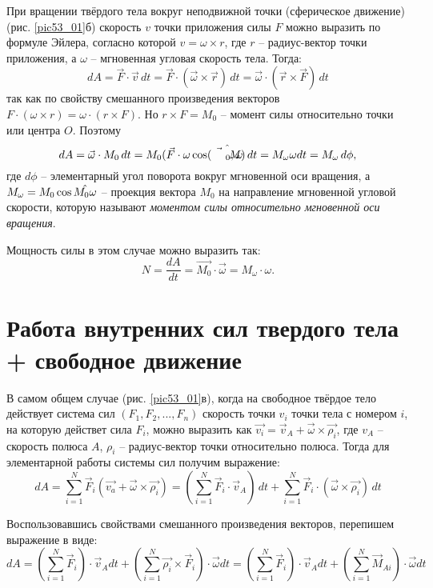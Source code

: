 При вращении твёрдого тела вокруг неподвижной точки 
(сферическое движение) (рис. \ref{pic53_01}б) скорость \( v \) точки 
приложения силы \( F \) можно выразить по 
формуле Эйлера, согласно которой \( v = \omega\times r \), где 
\( r \) -- радиус-вектор точки приложения, а \( \omega \) -- 
мгновенная угловая скорость тела. Тогда:
\[ 
	dA = \vec{F}\cdot\vec{v}\,dt = 
	\vec{F}\cdot\left(\vec{\omega}\times\vec{r}\right)\,dt =
	\vec{\omega}\cdot\left(\vec{r}\times\vec{F}\right)\,dt
\]
так как по свойству смешанного произведения векторов 
\( F\cdot\left( \omega\times r\right) = \omega\cdot\left( r\times F\right) \). 
Но \( r\times F = M_0 \) -- момент силы относительно точки или 
центра \( O \). Поэтому 
\[ 
	dA = \vec{\omega}\cdot M_0\,dt = 
	M_0(\vec{F}\cdot\omega\cos(\Hat{\vec{M}_0,\omega})\,dt =
	M_\omega\omega dt = M_\omega\,d\phi,
\]
где \( d\phi \) -- элементарный угол поворота вокруг мгновенной оси 
вращения, а \( M_\omega = M_0\cos\Hat{M_0\omega} \) -- 
проекция вектора \( M_0 \) на направление мгновенной угловой 
скорости, которую называют \emph{моментом силы относительно мгновенной 
оси вращения}.

Мощность силы в этом случае можно выразить так:
\[ 
	N = \frac{dA}{dt} = \vec{M_0}\cdot\vec{\omega} = M_\omega\cdot\omega.
\]

\section{Работа внутренних сил твердого тела + свободное движение}

В самом общем случае (рис. \ref{pic53_01}в), когда на свободное твёрдое тело 
действует система сил \( \left( F_1, F_2, ..., F_n \right) \) скорость 
точки \( v_i \) точки тела с номером \( i \), на которую действет сила 
\( F_i \), можно выразить как 
\( \vec{v_i} = \vec{v}_A + \vec{\omega}\times\vec{\rho_i} \), 
где \( v_A \) -- скорость полюса \( A \), \( \rho_i \) -- радиус-вектор 
точки относительно полюса. Тогда для элементарной работы системы сил 
получим выражение:
\[ 
	dA = \sum_{i=1}^{N} \vec{F}_i
	(\vec{v_a} + \vec{\omega}\times\vec{\rho_i}) =
	\left(\sum_{i=1}^{N}\vec{F}_i\cdot\vec{v}_A\right)\,dt + 
	\sum_{i=1}^{N}\vec{F}_i\cdot(\vec{\omega}\times\vec{\rho_i})\,dt
\]

Воспользовавшись свойствами смешанного произведения векторов, перепишем 
выражение в виде:
\[ 
	dA = \left( \sum_{i=1}^{N}\vec{F}_i \right)\cdot\vec{v}_Adt + 
	\left( \sum_{i=1}^{N} \vec{\rho_i}\times\vec{F}_i\right)\cdot\vec{\omega}dt = 
	\left( \sum_{i=1}^{N}\vec{F}_i \right)\cdot\vec{v}_Adt + 
	\left( \sum_{i=1}^{N} \vec{M}_{Ai} \right)\cdot\vec{\omega}dt
\]

